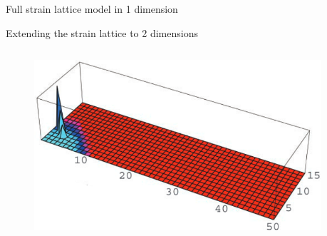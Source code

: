 \documentclass{beamer}
\begin{document}
\begin{frame}{Full strain lattice model in 1 dimension}
    \begin{figure}
        \centering
        \scalebox{0.8}{
        
        }
    \end{figure}
\end{frame}
\begin{frame}{Extending the strain lattice to 2 dimensions}
    \begin{columns}
        \begin{column}{0.5\textwidth}
            \begin{figure}
                \includegraphics[width=\textwidth]{gog_2d_fig/gog_2d_a_1.png}
            \end{figure}        
        \end{column}
        \begin{column}{0.5\textwidth}
        \end{column}
    \end{columns}
    \centering
    \vfill
    \tiny{\cite{gogDynamicsSelectionManystrain2002}}

\end{frame}
\end{document}
